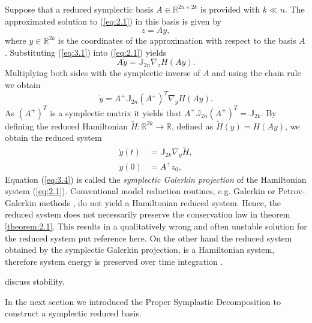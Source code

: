 Suppose that a reduced symplectic basis $A \in \mathbb R^{2n\times 2k}$ is provided with $k \ll n$. The approximated solution to (\ref{eq:2.1}) in this basis is given by
\begin{equation} \label{eq:3.1}
	z =Ay,
\end{equation}
where $y\in \mathbb R^{2k}$ is the coordinates of the approximation with respect to the basis $A$. Substituting (\ref{eq:3.1}) into (\ref{eq:2.1}) yields
\begin{equation} \label{eq:3.2}
	A \dot y = \mathbb{J}_{2n} \nabla_{z} H(A y).
\end{equation}
Multiplying both sides with the symplectic inverse of $A$ and using the chain rule we obtain
\begin{equation} \label{eq:3.3}
	\dot y = A^+ \mathbb{J}_{2n} (A^+)^T \nabla_{y} H(A y).
\end{equation}
As $(A^+)^T$ is a symplectic matrix it yields that $A^+ \mathbb{J}_{2n} (A^+)^T = \mathbb{J}_{2k}$. By defining the reduced Hamiltonian $\tilde H : \mathbb{R}^{2k} \to \mathbb R$, defined as $\tilde H (y) = H(Ay)$, we obtain the reduced system
\begin{equation} \label{eq:3.4}
	\begin{aligned}
	\dot {y}(t) &= \mathbb J_{2k} \nabla_{y} \tilde H, \\
	y(0) &= A^+ z_0,
	\end{aligned}
\end{equation}
Equation (\ref{eq:3.4}) is called the \emph{symplectic Galerkin projection} \cite{Peng:2014di} of the Hamiltonian system (\ref{eq:2.1}). Conventional model reduction routines, e.g. Galerkin or Petrov-Galerkin methods \cite{hesthaven2015certified,quarteroni2015reduced}, do not yield a Hamiltonian reduced system. Hence, the reduced system does not necessarily preserve the conservation law in theorem \ref{theorem:2.1}. This results in a qualitatively wrong and often unstable solution for the reduced system {\color{red} put reference here}. On the other hand the reduced system obtained by the symplectic Galerkin projection, is a Hamiltonian system, therefore system energy is preserved over time integration \cite{Peng:2014di}. 

\begin{definition}
\cite{bhatia2002stability} {\color{red} discuss stability}.
\end{definition}

In the next section we introduced the Proper Symplastic Decomposition to construct a symplectic reduced basis.

